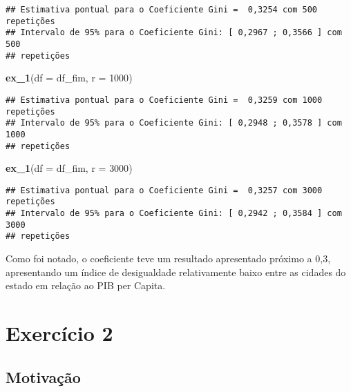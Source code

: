 \documentclass[11pt,]{article}
\newenvironment{Shaded}{\begin{snugshade}}{\end{snugshade}}
\newcommand{\DataTypeTok}[1]{\textcolor[rgb]{0.13,0.29,0.53}{#1}}
\newcommand{\DecValTok}[1]{\textcolor[rgb]{0.00,0.00,0.81}{#1}}
\newcommand{\KeywordTok}[1]{\textcolor[rgb]{0.13,0.29,0.53}{\textbf{#1}}}
\newcommand{\NormalTok}[1]{#1}
\begin{document}
\begin{verbatim}
## Estimativa pontual para o Coeficiente Gini =  0,3254 com 500 repetições
## Intervalo de 95% para o Coeficiente Gini: [ 0,2967 ; 0,3566 ] com 500
## repetições
\end{verbatim}

\begin{Shaded}
\begin{Highlighting}[]
\KeywordTok{ex_1}\NormalTok{(}\DataTypeTok{df =}\NormalTok{ df_fim, }\DataTypeTok{r =} \DecValTok{1000}\NormalTok{)}
\end{Highlighting}
\end{Shaded}

\begin{verbatim}
## Estimativa pontual para o Coeficiente Gini =  0,3259 com 1000 repetições
## Intervalo de 95% para o Coeficiente Gini: [ 0,2948 ; 0,3578 ] com 1000
## repetições
\end{verbatim}

\begin{Shaded}
\begin{Highlighting}[]
\KeywordTok{ex_1}\NormalTok{(}\DataTypeTok{df =}\NormalTok{ df_fim, }\DataTypeTok{r =} \DecValTok{3000}\NormalTok{)}
\end{Highlighting}
\end{Shaded}

\begin{verbatim}
## Estimativa pontual para o Coeficiente Gini =  0,3257 com 3000 repetições
## Intervalo de 95% para o Coeficiente Gini: [ 0,2942 ; 0,3584 ] com 3000
## repetições
\end{verbatim}

Como foi notado, o coeficiente teve um resultado apresentado próximo a
0,3, apresentando um índice de desigualdade relativamente baixo entre as
cidades do estado em relação ao PIB per Capita.

\newpage

\hypertarget{exercuxedcio-2}{%
\section{Exercício 2}\label{exercuxedcio-2}}

\hypertarget{motivauxe7uxe3o-1}{%
\subsection{Motivação}\label{motivauxe7uxe3o-1}}

~
\end{document}
